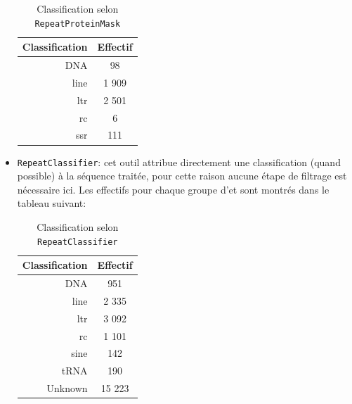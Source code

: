 \documentclass[10pt]{article}
\begin{document}
\begin{itemize}
    \begin{table}[H]
        \centering
        \begin{tabular}{r|c}
            \toprule
            \textbf{Classification} & \textbf{Effectif} \\
            \midrule
            \rowcolor{gray!10}
            DNA & 98 \\
            \acrshort{line} & 1 909 \\
            \rowcolor{gray!10}
            \acrshort{ltr} & 2 501 \\
            \acrshort{rc} & 6 \\
            \rowcolor{gray!10}
            \acrshort{ssr} & 111 \\
            \bottomrule
        \end{tabular}
        \caption{Classification selon \texttt{RepeatProteinMask}}
        \label{tab:repcprotmask_results}
    \end{table}
    
    \item[\ding{42}] \texttt{RepeatClassifier}: cet outil attribue directement une classification (quand possible) à la séquence traitée, pour cette raison aucune étape de filtrage est nécessaire ici. Les effectifs pour chaque groupe d'\acrshort{et} sont montrés dans le tableau suivant: \\
    \begin{table}[H]
        \centering
        \begin{tabular}{r|c}
            \toprule
            \textbf{Classification} & \textbf{Effectif} \\
            \midrule
            \rowcolor{gray!10}
            DNA & 951 \\
            \acrshort{line} & 2 335 \\
            \rowcolor{gray!10}
            \acrshort{ltr} & 3 092 \\
            \acrshort{rc} & 1 101 \\
            \rowcolor{gray!10}
            \acrshort{sine} & 142 \\
            tRNA & 190 \\
            \rowcolor{gray!10}
            Unknown & 15 223 \\
            \bottomrule
        \end{tabular}
        \caption{Classification selon \texttt{RepeatClassifier}}
        \label{tab:repclassifier_results}
    \end{table}

\end{itemize}
\end{document}
